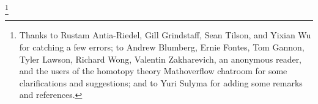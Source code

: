 
\author{Arun Debray}
\date{\today}
\thanks{Thanks to Rustam Antia-Riedel, Gill Grindstaff, Sean Tilson, and Yixian Wu for catching a few errors; to
Andrew Blumberg, Ernie Fontes, Tom Gannon, Tyler Lawson, Richard Wong, Valentin Zakharevich, an anonymous reader,
and the users of the homotopy theory Mathoverflow chatroom for some clarifications and suggestions; and to Yuri
Sulyma for adding some remarks and references.}


\usepackage[charter]{mathdesign}
\usepackage[T1]{fontenc}
\usepackage{tikz}
\usetikzlibrary{shapes.geometric}

\renewcommand{\term}[1]{{\bfseries #1}}
\newcommand{\sSet}{\cat{sSet}}
\DeclareMathOperator{\Map}{Map}
\DeclareMathOperator{\rank}{rank\,}
\DeclareMathOperator{\Un}{Un}
\newcommand{\KU}{\mathit{KU}}
\newcommand{\isom}{\stackrel\cong\to}
\DeclareMathOperator{\Ind}{Ind}
\DeclareMathOperator{\CoInd}{CoInd}
\newcommand{\Spc}{\cat{Sp}}
\newcommand{\overwedge}{\mathbin{\overline\wedge}}
\DeclareMathOperator{\Ev}{Ev}
\newcommand{\sW}{\mathscr W}
\DeclareMathOperator{\Ho}{Ho}
\newcommand{\simeqto}{\stackrel\simeq\to}
\newcommand{\congto}{\stackrel\cong\to}
\newcommand{\wI}{\widetilde I}
\newcommand{\WH}{\mathit{WH}}
\newcommand{\NH}{\mathit{NH}}
\newcommand{\sus}{\Sigma^\infty}
\DeclareMathOperator{\Span}{Span}
\DeclareMathOperator{\tr}{tr}
\newcommand{\RO}{\mathrm{RO}}
\DeclareMathOperator{\Res}{Res}
\DeclareMathOperator{\Tr}{Tr}
\newcommand{\fV}{\cat V}
\newcommand{\rop}{^{\mathrm{op}}} %
\newcommand{\cotensor}{\mathbin\square}
\newcommand{\Mac}{\cat{Mac}}
\newcommand{\Bispan}{\cat{Bispan}}
\newcommand{\Orb}{\cat{Orb}}
\newcommand{\THH}{\mathit{THH}}
\newcommand{\MU}{\mathit{MU}}
\renewcommand{\MR}{\mathit{MR}}
\newcommand{\tH}{\widehat H} %
\newcommand{\tEG}{\widetilde{EG}}
\newcommand{\MO}{\mathit{MO}}
\DeclareMathOperator{\Tot}{Tot}
\newcommand{\sk}{\mathrm{sk}}
\newcommand{\KR}{\mathit{KR}}

\newcommand{\LD}{\mathbf L}
\newcommand{\RD}{\mathbf R}

\DeclareMathOperator{\Lan}{Lan}
\DeclareMathOperator{\Ran}{Ran}

